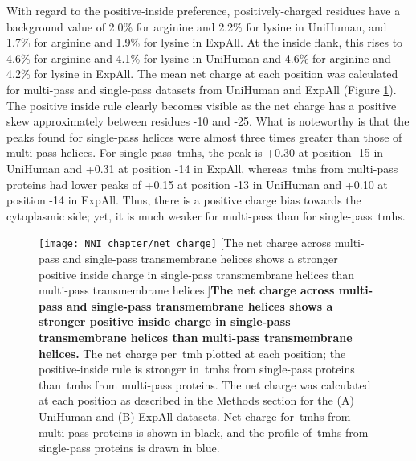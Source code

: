 With regard to the positive-inside preference, positively\--charged residues have a background value of 2.0\% for arginine and 2.2\% for lysine in UniHuman, and 1.7\% for arginine and 1.9\% for lysine in ExpAll.
At the inside flank, this rises to 4.6\% for arginine and 4.1\% for lysine in UniHuman and 4.6\% for arginine and 4.2\% for lysine in ExpAll.
The mean net charge at each position was calculated for multi\--pass and single\--pass datasets from UniHuman and ExpAll (Figure \ref{fig:net_charge}).
The positive inside rule clearly becomes visible as the net charge has a positive skew approximately between residues -10 and -25.
What is noteworthy is that the peaks found for single\--pass helices were almost three times greater than those of multi\--pass helices.
For single\--pass~\gls{tmh}s, the peak is +0.30 at position -15 in UniHuman and +0.31 at position -14 in ExpAll, whereas~\gls{tmh}s from multi\--pass proteins had lower peaks of +0.15 at position -13 in UniHuman and +0.10 at position -14 in ExpAll.
Thus, there is a positive charge bias towards the cytoplasmic side; yet, it is much weaker for multi\--pass than for single\--pass~\gls{tmh}s.

\begin{figure}[!ht]
\centering
\texttt{[image: NNI\_chapter/net\_charge]}
[The net charge across multi\--pass and single\--pass transmembrane helices shows a stronger positive inside charge in single\--pass transmembrane helices than multi\--pass transmembrane helices.]{\textbf{The net charge across multi\--pass and single\--pass transmembrane helices shows a stronger positive inside charge in single\--pass transmembrane helices than multi\--pass transmembrane helices.}
The net charge per~\gls{tmh} plotted at each position; the positive-inside rule is stronger in~\gls{tmh}s from single\--pass proteins than~\gls{tmh}s from multi\--pass proteins.
The net charge was calculated at each position as described in the Methods section for the (A) UniHuman and (B) ExpAll datasets.
Net charge for~\gls{tmh}s from multi\--pass proteins is shown in black, and the profile of~\gls{tmh}s from single\--pass proteins is drawn in blue.}

\label{fig:net_charge}
\end{figure}

